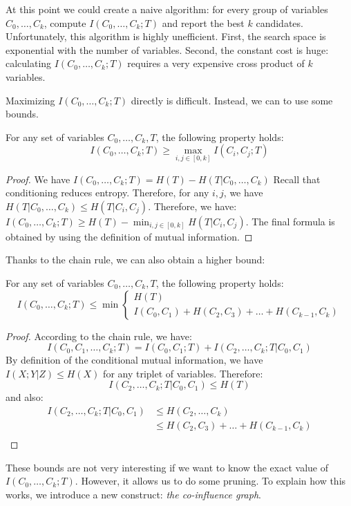 At this point we could create a naive algorithm: for every group of variables
$C_0, \ldots,C_k$, compute $I(C_0, \ldots, C_k; T)$ and report the best $k$
candidates.
Unfortunately, this algorithm is highly unefficient. First, the search space is
exponential with the number of variables. Second, the constant cost is huge:
calculating $I(C_0, \ldots, C_k; T)$ requires a very expensive cross product of
$k$ variables.

Maximizing $I(C_0, \ldots, C_k; T)$ directly is difficult.  Instead, we can
to use some bounds.

\begin{lemma}
    For any set of variables $C_0, \ldots, C_k, T$, the following property holds:
    $$
        I(C_0, \ldots, C_k; T) \geq \max_{i,j\in [0,k]} I(C_i, C_j ; T)
    $$
\end{lemma}

\begin{proof}
    We have $I(C_0, \ldots, C_k; T) = H(T) - H(T|C_0, \ldots, C_k)$ Recall that
    conditioning reduces entropy. Therefore, for any $i,j$, we have $H(T|C_0,
    \ldots, C_k) \leq H(T |C_i, C_j)$. Therefore, we have:
    $I(C_0, \ldots, C_k; T) \geq H(T) - \min_{i,j\in [0,k]} H(T | C_i, C_j)$.
    The final formula is obtained by using the definition of mutual
    information.
\end{proof}

Thanks to the chain rule, we can also obtain a higher bound:

\begin{lemma}
    For any set of variables $C_0, \ldots, C_k, T$, the following property holds:
    \[ 
    I(C_0, \ldots, C_k; T) \leq \min
    \begin{cases}
        H(T)\\
        I(C_0, C_1) + H(C_2, C_3) + \ldots + H(C_{k-1}, C_k)
    \end{cases}
   \] 
\end{lemma}

\begin{proof}
According to the chain rule, we have: 
$$
I(C_0, C_1, \ldots, C_k;T) = I(C_0, C_1 ; T) + I(C_2,\ldots,C_k ; T | C_0, C_1)
$$
By definition of the conditional mutual information, we have $I(X;Y|Z) \leq
H(X)$ for any triplet of variables. Therefore:
\[
    I(C_2,\ldots,C_k ; T | C_0, C_1) \leq H(T)
\]and also:
\[
    \begin{split}
        I(C_2,\ldots,C_k ; T | C_0, C_1) & \leq H(C_2,\ldots,C_k)\\
        & \leq H(C_2, C_3) + \ldots + H(C_{k-1},C_k)\\
    \end{split}
\]
\end{proof}
These bounds are not very interesting if we want to know the exact value of
$I(C_0, \ldots, C_k; T)$. However, it allows us to do some pruning.
To explain how this works, we introduce a new construct: \emph{the
co-influence graph}.

